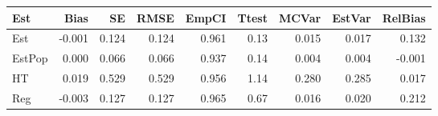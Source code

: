 
\begin{tabular}{lrrrrrrrr}
\toprule
Est & Bias & SE & RMSE & EmpCI & Ttest & MCVar & EstVar & RelBias\\
\midrule
Est & -0.001 & 0.124 & 0.124 & 0.961 & 0.13 & 0.015 & 0.017 & 0.132\\
EstPop & 0.000 & 0.066 & 0.066 & 0.937 & 0.14 & 0.004 & 0.004 & -0.001\\
HT & 0.019 & 0.529 & 0.529 & 0.956 & 1.14 & 0.280 & 0.285 & 0.017\\
Reg & -0.003 & 0.127 & 0.127 & 0.965 & 0.67 & 0.016 & 0.020 & 0.212\\
\bottomrule
\end{tabular}